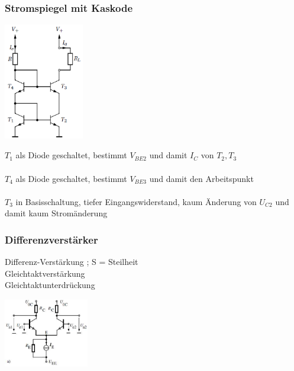 \begin{multicols}{2}
		\subsubsection{Stromspiegel mit Kaskode}
			\begin{minipage}{3.5cm}
				\includegraphics[width=3.5cm]{./images/stromspiegel-kaskode} 
			\end{minipage}
			\begin{minipage}{4.5cm}
				$T_1$ als Diode geschaltet, bestimmt $V_{BE2}$ und damit $I_C$ von $T_2,T_3$ \\\\
				$T_4$ als Diode geschaltet, bestimmt $V_{BE3}$ und damit den Arbeitspunkt \\\\
				$T_3$ in Basisschaltung, tiefer Eingangswiderstand, kaum Änderung von $U_{C2}$ und damit kaum Stromänderung
			\end{minipage}
		\end{multicols}
							
         \subsubsection{Differenzverstärker}
             \begin{minipage}[T]{12cm}
                 Differenz-Verstärkung
                 \hspace{8.4mm} ; S = Steilheit\\
                 Gleichtaktverstärkung
                 \hspace{8.1mm}\\
                 Gleichtaktunterdrückung
                 \hspace{3.8mm}
             \end{minipage}
             \begin{minipage}{4cm}
                 \includegraphics[height=3cm]{./images/BipTraDiffAmp.png}
             \end{minipage}\\
             
